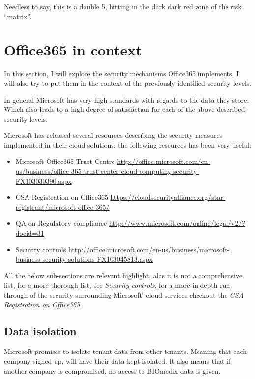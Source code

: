 \documentclass[paper=a4, fontsize=11pt]{scrartcl} %
\numberwithin{equation}{section} %
\numberwithin{figure}{section} %
\numberwithin{table}{section} %
\begin{document}
Needless to say, this is a double 5, hitting in the dark dark red zone of the
risk ``matrix''.

\section{Office365 in context}
In this section, I will explore the security mechanisms Office365 implements. I
will also try to put them in the context of the previously identified security 
levels.


In general Microsoft has very high standards with regards to the data they
store. Which also leads to a high degree of satisfaction for each of the above
described security levels.

Microsoft has released several resources describing the security measures
implemented in their cloud solutions, the following resources has been very
useful:

\begin{itemize}
\item Microsoft Office365 Trust Centre
\href{http://office.microsoft.com/en-us/business/office-365-trust-center-cloud-computing-security-FX103030390.aspx}
     {http://office.microsoft.com/en-us/business/office-365-trust-center-cloud-computing-security-FX103030390.aspx}
\item CSA Registration on Office365
\href{https://cloudsecurityalliance.org/star-registrant/microsoft-office-365/}
     {https://cloudsecurityalliance.org/star-registrant/microsoft-office-365/}
\item QA on Regulatory compliance \href{http://www.microsoft.com/online/legal/v2/?docid=31}
    {http://www.microsoft.com/online/legal/v2/?docid=31}
\item Security controls
\href{http://office.microsoft.com/en-us/business/microsoft-business-security-solutions-FX103045813.aspx}
     {http://office.microsoft.com/en-us/business/microsoft-business-security-solutions-FX103045813.aspx}
\end{itemize}

All the below sub-sections are relevant highlight, alas it is not a
comprehensive list, for a more thorough list, see \textit{Security controls},
for a more in-depth run through of the security surrounding Microsoft' cloud
services checkout the \textit{CSA Registration on Office365}.

\subsection{Data isolation}
Microsoft promises to isolate tenant data from other tenants. Meaning that each
company signed up, will have their data kept isolated. It also means that if
another company is compromised, no access to BIOmedix data is given.
\end{document}
